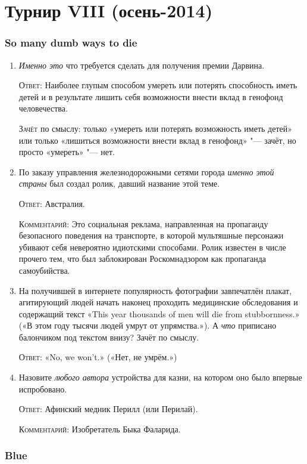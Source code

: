 \documentclass[a4paper,10pt]{article}
\let\keyword\textsc
\newenvironment{topic}{\begin{enumerate}}{\end{enumerate}}
\newcommand{\question}[3]{\item[#1.] #2 \par \keyword{Ответ:} #3}
\newcommand{\commentary}[1]{\par \keyword{Комментарий:} #1}
\newcommand{\criterion}[1]{\par \keyword{Зачёт} #1}
\begin{document}
\newpage
\part{Турнир VIII (осень-2014)}

\section{So many dumb ways to die}

\begin{topic}
  \question{10}{\emph{Именно это} что требуется сделать для получения премии Дарвина.}{Наиболее глупым способом умереть или потерять способность иметь детей и в результате лишить себя возможности внести вклад в генофонд человечества.}\criterion{по смыслу: только «умереть или потерять возможность иметь детей» или только «лишиться возможности внести вклад в генофонд» "--- зачёт, но просто «умереть» "--- нет.}
  \question{20}{По заказу управления железнодорожными сетями города \emph{именно этой страны} был создал ролик, давший название этой теме.}{Австралия.}\commentary{Это социальная реклама, направленная на пропаганду безопасного поведения на транспорте, в которой мультяшные персонажи убивают себя невероятно идиотскими способами. Ролик известен в числе прочего тем, что был заблокирован Роскомнадзором как пропаганда самоубийства.}
  \question{30}{На получившей в интернете популярность фотографии завпечатлён плакат, агитирующий людей начать наконец проходить медицинские обследования и содержащий текст «This year thousands of men will die from stubbornness.» («В этом году тысячи людей умрут от упрямства.»). А \emph{что} приписано балончиком под текстом внизу? Зачёт по смыслу.}{«No, we won't.» («Нет, не умрём.»)}
  \question{40}{Назовите \emph{любого автора} устройства для казни, на котором оно было впервые испробовано.}{Афинский медник Перилл (или Перилай).}\commentary{Изобретатель Быка Фаларида.}
\end{topic}


\section{Blue}
\end{document}
